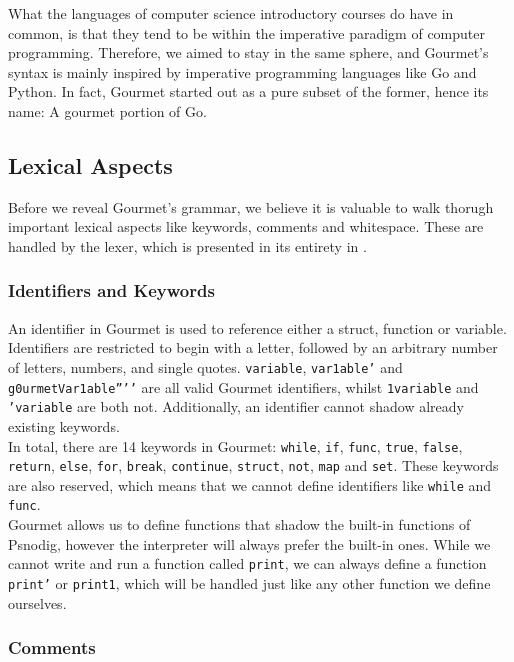 What the languages of computer science introductory courses do have in common, is that they tend to be within the imperative paradigm of computer programming. Therefore, we aimed to stay in the same sphere, and Gourmet's syntax is mainly inspired by imperative programming languages like Go and Python. In fact, Gourmet started out as a pure subset of the former, hence its name: A gourmet portion of Go.

\subsection{Lexical Aspects}

Before we reveal Gourmet's grammar, we believe it is valuable to walk thorugh important lexical aspects like keywords, comments and whitespace. These are handled by the lexer, which is presented in its entirety in .

\subsubsection{Identifiers and Keywords}

An identifier in Gourmet is used to reference either a struct, function or variable. Identifiers are restricted to begin with a letter, followed by an arbitrary number of letters, numbers, and single quotes. \texttt{variable}, \texttt{var1able’} and \texttt{g0urmetVar1able''’'} are all valid Gourmet identifiers, whilst \texttt{1variable} and \texttt{'variable} are both not. Additionally, an identifier cannot shadow already existing keywords. \\

In total, there are 14 keywords in Gourmet: \texttt{while}, \texttt{if}, \texttt{func}, \texttt{true}, \texttt{false}, \texttt{return}, \texttt{else}, \texttt{for}, \texttt{break}, \texttt{continue}, \texttt{struct}, \texttt{not}, \texttt{map} and \texttt{set}. These keywords are also reserved, which means that we cannot define identifiers like \texttt{while} and \texttt{func}. \\

Gourmet allows us to define functions that shadow the built-in functions of Psnodig, however the interpreter will always prefer the built-in ones. While we cannot write and run a function called \texttt{print}, we can always define a function \texttt{print’} or \texttt{print1}, which will be handled just like any other function we define ourselves.

\subsubsection{Comments}

